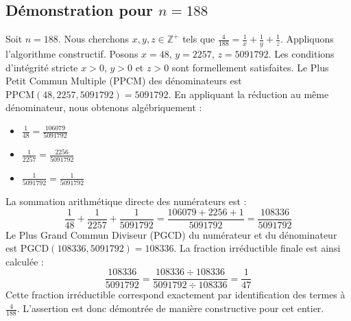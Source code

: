 \documentclass[11pt,a4paper]{article}
\begin{document}
\subsection{Démonstration pour $n = 188$}
Soit $n = 188$. Nous cherchons $x, y, z \in \mathbb{Z}^{+}$ tels que $\frac{4}{188} = \frac{1}{x} + \frac{1}{y} + \frac{1}{z}$.
Appliquons l'algorithme constructif. Posons $x = 48$, $y = 2257$, $z = 5091792$.
Les conditions d'intégrité stricte $x > 0$, $y > 0$ et $z > 0$ sont formellement satisfaites.
Le Plus Petit Commun Multiple (PPCM) des dénominateurs est $\text{PPCM}(48, 2257, 5091792) = 5091792$.
En appliquant la réduction au même dénominateur, nous obtenons algébriquement :
\begin{itemize}
    \item $\frac{1}{48} = \frac{106079}{5091792}$
    \item $\frac{1}{2257} = \frac{2256}{5091792}$
    \item $\frac{1}{5091792} = \frac{1}{5091792}$
\end{itemize}
La sommation arithmétique directe des numérateurs est :
$$ \frac{1}{48} + \frac{1}{2257} + \frac{1}{5091792} = \frac{106079 + 2256 + 1}{5091792} = \frac{108336}{5091792} $$
Le Plus Grand Commun Diviseur (PGCD) du numérateur et du dénominateur est $\text{PGCD}(108336, 5091792) = 108336$.
La fraction irréductible finale est ainsi calculée :
$$ \frac{108336}{5091792} = \frac{108336 \div 108336}{5091792 \div 108336} = \frac{1}{47} $$
Cette fraction irréductible correspond exactement par identification des termes à $\frac{4}{188}$. L'assertion est donc démontrée de manière constructive pour cet entier.
\end{document}
